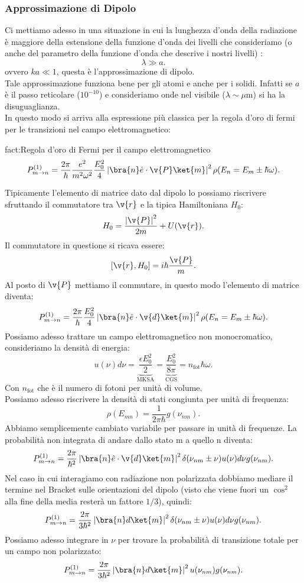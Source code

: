 \subsubsection{Approssimazione di Dipolo}%
Ci mettiamo adesso in una situazione in cui la lunghezza d'onda della radiazione è maggiore della estensione della funzione d'onda dei livelli che consideriamo (o anche del parametro della funzione d'onda che descrive i nostri livelli) :
\[
\lambda  \gg a
.\] 
ovvero $ka \ll 1$, questa è l'approssimazione di dipolo. \\
Tale approssimazione funziona bene per gli atomi e anche per i solidi. Infatti se $a$ è il passo reticolare ($10^{-10}$) e consideriamo onde nel visibile ($\lambda\sim \mu$m) si ha la disuguaglianza.\\
In questo modo si arriva alla espressione più classica per la regola d'oro di fermi per le transizioni nel campo elettromagnetico:
\begin{fact}{fact:Regola d'oro di Fermi per il campo elettromagnetico}
\[
    P^{(1) }_{m\to n}= 
    \frac{2\pi}{\hbar }\frac{e^2}{m^2\omega^2}\frac{E_0^2}{4}
    \left|\bra{n}\hat{e}\cdot \v{P} \ket{m}\right|^2
    \rho(E_n=E_m \pm \hbar \omega) 
.\] 
\end{fact}
Tipicamente l'elemento di matrice dato dal dipolo lo possiamo riscrivere sfruttando il commutatore tra $\v{r}$ e la tipica Hamiltoniana $H_0$:
\[
    H_0 = \frac{\left|\v{P}\right|^2}{2m} + U(\v{r}) 
.\] 
Il commutatore in questione si ricava essere:
\[
    \left[\v{r},H_0\right]=i \hbar \frac{\v{P}}{m}
.\] 
Al posto di $\v{P}$ mettiamo il commutare, in questo modo l'elemento di matrice diventa:
\[
    P^{(1) }_{m\to n}= 
    \frac{2\pi}{\hbar }\frac{E_0^2}{4}
    \left|\bra{n}\hat{e}\cdot \v{d} \ket{m}\right|^2
    \rho(E_n=E_m \pm \hbar \omega) 
.\] 
Possiamo adesso trattare un campo elettromagnetico non monocromatico, consideriamo la densità di energia:
\[
    u(\nu) d\nu
    = \underbrace{\frac{\epsilon E_0^2}{2}}_{\text{MKSA}} 
    = \underbrace{\frac{E_0^2}{8\pi}}_{\text{CGS}} 
    = n_\text{fot}\hbar \omega 
.\] 
Con $n_\text{fot} $ che è il numero di fotoni per unità di volume.\\
Possiamo adesso riscrivere la densità di stati congiunta per unità di frequenza:
\[
    \rho(E_{mn}) = \frac{1}{2\pi\hbar }g(\nu_{nm}) 
.\] 
Abbiamo semplicemente cambiato variabile per passare in unità di frequenze. La probabilità non integrata di andare dallo stato m a quello n diventa:
\[
    P^{(1)}_{m\to n} =
    \frac{2\pi}{\hbar ^2}\left|\bra{n}\hat{e}\cdot \v{d} \ket{m}\right|^2
    \delta (\nu_{nm}\pm \nu) u(\nu) d\nu g(\nu_{nm}) 
.\] 
Nel caso in cui interagiamo con radiazione non polarizzata dobbiamo mediare il termine nel Bracket sulle orientazioni del dipolo (visto che viene fuori un $\cos^2$ alla fine della media resterà un fattore $1 /3$), quindi:
\[
    P^{(1)}_{m\to n} =
    \frac{2\pi}{3\hbar ^2}\left|\bra{n}d \ket{m}\right|^2
    \delta (\nu_{nm}\pm \nu) u(\nu) d\nu g(\nu_{nm}) 
.\]
Possiamo adesso integrare in $\nu$ per trovare la probabilità di transizione totale per un campo non polarizzato:
\[
    P^{(1) }_{m\to n}= \frac{2\pi}{3\hbar ^2}\left|\bra{n}d \ket{m}\right|^2
    u(\nu_{nm}) g(\nu_{nm}) 
.\] 
